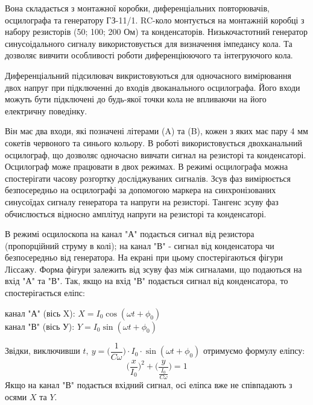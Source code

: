 \documentclass[a4paper,12pt]{article}
\begin{document}
    Вона складається з монтажної коробки, диференціальних повторювачів, 
    осцилографа та генератору ГЗ-11/1. RC-коло монтується на монтажній коробці з 
    набору резисторів (50; 100; 200 Ом) та конденсаторів. Низькочастотний генератор 
    синусоідального сигналу використовується для визначення імпедансу кола. Та 
    дозволяє вивчити особливості роботи диференціюючого та інтегруючого кола. 

    Диференціальний підсилювач викристовуються для одночасного вимірювання 
    двох напруг при підключенні до входів двоканального осцилографа. Його входи 
    можуть бути підключені до будь-якої точки кола не впливаючи на його електричну поведінку.

    Він має два входи, які позначені літерами (A) та (B), кожен з яких має пару 4 мм 
    сокетів червоного та синього кольору. В роботі використовується двохканальний 
    осцилограф, що дозволяє одночасно вивчати сигнал на резисторі та конденсаторі. 
    Осцилограф може працювати в двох режимах. В режимі осцилографа можна 
    спостерігати часову розгортку досліджуваних сигналів. Зсув фаз вимірюється 
    безпосередньо на осцилографі за допомогою маркера на синхронізованих 
    синусоїдах сигналу генератора та напруги на резисторі. Тангенс зсуву фаз 
    обчислюється відносно амплітуд напруги на резисторі та конденсаторі.

    В режимі осцилоскопа на канал "А" подається сигнал від резистора 
    (пропорційний струму в колі); на канал "В" - сигнал від конденсатора чи 
    безпосередньо від генератора. На екрані при цьому спостерігаються фігури Ліссажу. 
    Форма фігури залежить від зсуву фаз між сигналами, що подаються на вхід "А" та 
    "В". Так, якщо на вхід "В" подається сигнал від конденсатора, то спостерігається еліпс:
    \begin{center}
        канал "А" (вісь X): $X=I_0\cos(\omega t+\phi_0)$ \\
        канал "В" (вісь У): $Y=I_0\sin(\omega t+\phi_0)$
    \end{center}
    Звідки, виключивши $t,\: y=\biggl(\dfrac{1}{C\omega}\biggr)\cdot I_0\cdot\sin(\omega t+\phi_0)$ отримуємо формулу еліпсу:
    $$\biggl(\dfrac{x}{I_0}\biggr)^2+\biggl(\dfrac{y}{\frac{I_0}{C\omega}}\biggr)=1$$
    Якщо на канал "В" подається вхідний сигнал, осі еліпса вже не співпадають з осями $X$ та $Y$.
\end{document}
